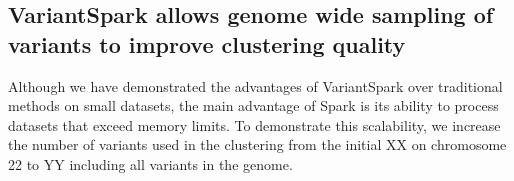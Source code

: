 \documentclass{bmcart}
\newcommand{\variantSpark}{{\sc VariantSpark}}
\newcommand{\kMeans}{\textit{k}-means}
\newcommand{\ARI}{adjusted Rand index}
\begin{document}


\subsection*{\variantSpark{} allows genome wide sampling of variants to improve clustering quality}

Although we have demonstrated the advantages of \variantSpark{} over traditional methods on small datasets, the main advantage of {\sc Spark} is its ability to process datasets that exceed memory limits.
To demonstrate this scalability, we increase the number of variants used in the clustering from the initial XX on chromosome 22 to YY including all variants in the genome.

\end{document}
